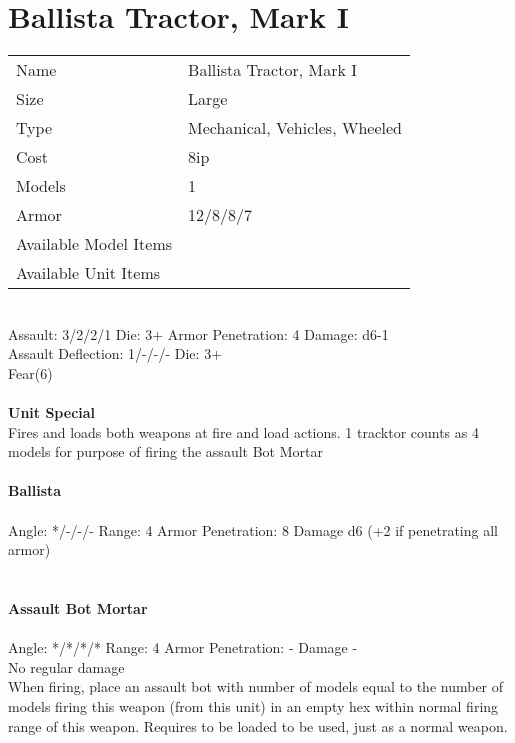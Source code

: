 \pagebreak

\section{ Ballista Tractor, Mark I }

\begin{tabular}{ll}
  Name & Ballista Tractor, Mark I \\
  Size & Large\\
  Type & Mechanical, Vehicles, Wheeled\\
  Cost & 8ip\\
  Models & 1\\
  Armor & 12/8/8/7\\
  Available Model Items &  \\
  Available Unit Items &  \\
\end{tabular}

\ \\
Assault: 3/2/2/1 Die: 3+ Armor Penetration: 4 Damage: d6-1 \\
Assault Deflection: 1/-/-/- Die: 3+\\
\indent Fear(6) \\
\ \\

{\bf Unit Special} \\
Fires and loads both weapons at fire and load actions. 1 tracktor counts as 4 models for purpose of firing the assault Bot Mortar
\ \\
\ \\
{\bf Ballista } \\
\ \\
Angle: */-/-/- Range: 4 Armor Penetration: 8 Damage d6 (+2 if penetrating all armor) \\
\indent  \\



\ \\
{\bf Assault Bot Mortar } \\
\ \\
Angle: */*/*/* Range: 4 Armor Penetration: - Damage - \\
\indent No regular damage\\ When firing, place an assault bot with number of models equal to the number of models firing this weapon (from this unit) in an empty hex within normal firing range of this weapon. Requires to be loaded to be used, just as a normal weapon. \\





